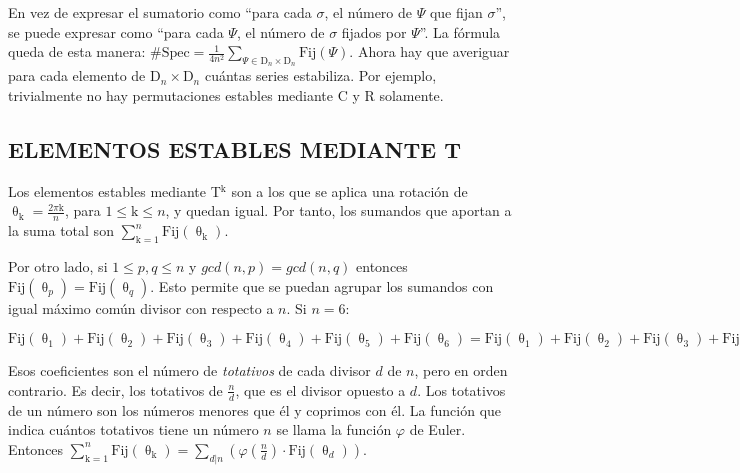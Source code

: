 		En vez de expresar el sumatorio como ``para cada $\sigma$, el número de $\Psi$ que fijan $\sigma$'', se puede expresar como ``para cada $\Psi$, el número de $\sigma$ fijados por $\Psi$''. La fórmula queda de esta manera:
		$\#\text{Spec}=\frac{1}{4n^2}\sum_{\Psi\in\text{D}_{n}\times\text{D}_{n}}\text{Fij}(\Psi)$. Ahora hay que averiguar para cada elemento de $\text{D}_{n}\times\text{D}_{n}$ cuántas series estabiliza. Por ejemplo, trivialmente no hay permutaciones estables mediante C y R solamente.
		
		\subsection{ELEMENTOS ESTABLES MEDIANTE T}
		
		Los elementos estables mediante T$^\text{k}$ son a los que se aplica una rotación de $\uptheta_\text{k}=\frac{2\pi\text{k}}{n}$, para $1\leq\text{k}\leq n$, y quedan igual. Por tanto, los sumandos que aportan a la suma total son $\sum_{\text{k}=1}^{n}\text{Fij}(\uptheta_\text{k})$.
		
		Por otro lado, si $1\leq p,q\leq n$ y $gcd(n,p)=gcd(n,q)$ entonces $\text{Fij}(\uptheta_p)=\text{Fij}(\uptheta_q)$. Esto permite que se puedan agrupar los sumandos con igual máximo común divisor con respecto a $n$. Si $n=6$: 
		
		$\text{Fij}(\uptheta_\text{1})+\text{Fij}(\uptheta_\text{2})+\text{Fij}(\uptheta_\text{3})+\text{Fij}(\uptheta_\text{4})+\text{Fij}(\uptheta_\text{5})+\text{Fij}(\uptheta_\text{6})=%
		\text{Fij}(\uptheta_\text{1})+\text{Fij}(\uptheta_\text{2})+\text{Fij}(\uptheta_\text{3})+\text{Fij}(\uptheta_\text{2})+\text{Fij}(\uptheta_\text{1})+\text{Fij}(\uptheta_\text{6})=%
		2\cdot\text{Fij}(\uptheta_\text{1})+2\cdot\text{Fij}(\uptheta_\text{2})+1\cdot\text{Fij}(\uptheta_\text{3})+1\cdot\text{Fij}(\uptheta_\text{6})$
		
		Esos coeficientes son el número de \textit{totativos} de cada divisor $d$ de $n$, pero en orden contrario. Es decir, los totativos de $\frac{n}{d}$, que es el divisor opuesto a $d$. Los totativos de un número son los números menores que él y coprimos con él. La función que indica cuántos totativos tiene un número $n$ se llama la función $\varphi$ de Euler. Entonces $\sum_{\text{k}=1}^{n}\text{Fij}(\uptheta_\text{k})=\sum_{d|n}\left(\varphi(\frac{n}{d})\cdot\text{Fij}(\uptheta_d)\right)$.
		
